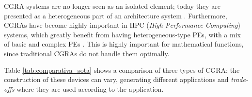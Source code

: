 \documentclass[conference]{IEEEtran}
\begin{document}
CGRA systems are no longer seen as an isolated element; today they are presented as a heterogeneous part of an architecture system \cite{dvhetero}.
Furthermore, CGRAs have become highly important in HPC (\textit{High Performance Computing}) systems, which greatly benefit from having heterogeneous-type PEs, with a mix of basic and complex PEs \cite{exploration_tradeoffs}. This is highly important for mathematical functions, since traditional CGRAs do not handle them optimally.



Table \ref{tab:comparativa_sota} shows a comparison of three types of CGRA; the construction of these devices can vary,
generating different applications and \textit{trade-offs} where they are used according to the application.
\end{document}
